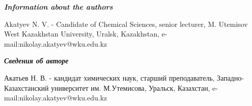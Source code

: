 \emph{{\bfseries Information about the authors}}

\begin{noparindent}
Akatyev N. V. - Candidate of Chemical Sciences, senior lecturer, M.
Utemisov West Kazakhstan University, Uralsk, Kazakhstan,
e-mail:nikolay.akatyev@wku.edu.kz
\end{noparindent}

\emph{{\bfseries Сведения об авторе}}

\begin{noparindent}
Акатьев Н. В. - кандидат химических наук, старший преподаватель,
Западно-Казахстанский университет им. М.Утемисова, Уральск, Казахстан,
e-mail:nikolay.akatyev@wku.edu.kz
\end{noparindent}
